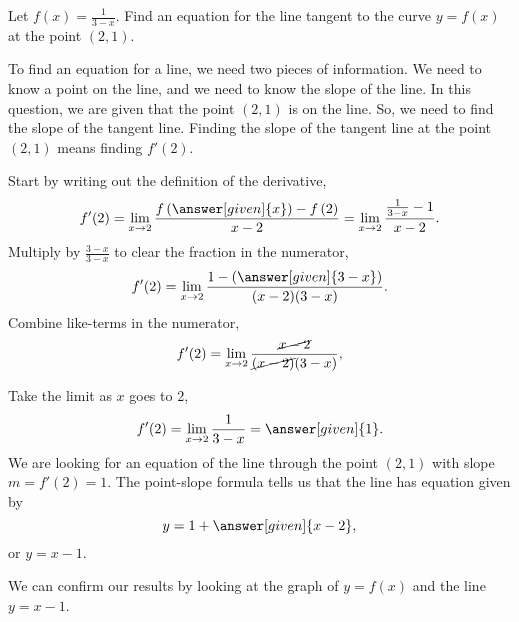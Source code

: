 \documentclass{ximera}
\begin{document}
	\begin{example}
	Let $f(x) = \frac{1}{3-x}$.
  Find an equation for the line tangent to the curve $y=f(x)$ at the point $(2, 1)$.
  \begin{explanation}
    To find an equation for a line, we need two pieces of information.  We need to know
    a point on the line, and we need to know the slope of the line.  In this question, we are given
    that  the point $(2,1)$ is on the line.  So, we need to find the slope of the tangent line.
    Finding the slope of the tangent line at the point $(2,1)$ means finding $f'(2)$.
    
    Start by writing out the definition of the derivative,
    \[
    f'(2) = \lim_{x\to 2} \frac{f\left(\answer[given]{x}\right)-f\left(2\right)}{x-2} = \lim_{x\to 2} \frac{\frac{1}{3-x}-1}{x-2}.
    \]
    Multiply by $\frac{3-x}{3-x}$ to clear the fraction in the numerator,
    \[
    f'(2) = \lim_{x\to 2} \frac{1 - \left(\answer[given]{3-x}\right)}{(x-2)(3-x)}.
    \]
    Combine like-terms in the numerator,
    \[
    f'(2) = \lim_{x\to 2} \frac{\cancel{x-2}}{\cancel{(x-2)}(3-x)},
    \]
    	
    Take the limit as $x$ goes to $2$,
    \[
    f'(2)= \lim_{x\to 2} \frac{1}{3-x} = \answer[given]{1}.
    \]
    We are looking for an equation of the line through the point
    $(2,1)$ with slope $m = f'(2) = 1$.  The point-slope formula tells
    us that the line has equation given by
    \[
    y= 1+\answer[given]{x-2 },
    \]
    or $y=x-1$.
  \begin{onlineOnly}
  We can confirm our results by looking at the graph of $y=f(x)$ and the line $y=x-1$. 
  \begin{image}
\end{image}
\end{onlineOnly}
\end{explanation}
\end{example}
\end{document}
